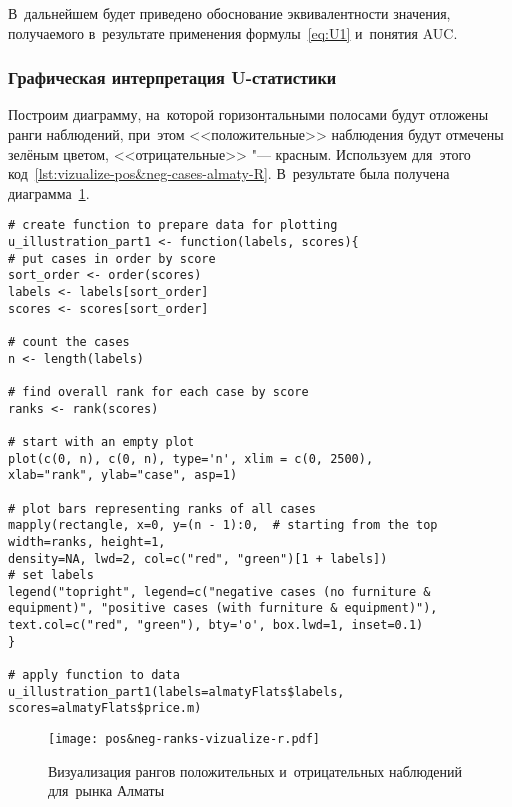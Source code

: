 \documentclass[]{scrreprt}
\begin{document}
В~дальнейшем будет приведено обоснование эквивалентности значения, получаемого в~результате применения формулы~\ref{eq:U1} и~понятия AUC.
%
\subsubsection{Графическая интерпретация U-статистики}
Построим диаграмму, на~которой горизонтальными полосами будут отложены ранги наблюдений, при~этом <<положительные>> наблюдения будут отмечены зелёным цветом, <<отрицательные>> "--- красным. Используем для~этого код~\ref{lst:vizualize-pos&neg-cases-almaty-R}. В~результате была получена диаграмма~\ref{fig:pos&neg-ranks-vizualize-r.pdf}.
%
\begin{lstlisting}[float, caption = Визуализация рангов положительных и~отрицательных наблюдений для~рынка Алматы, firstnumber=1, label= lst:vizualize-pos&neg-cases-almaty-R]
# create function to prepare data for plotting
u_illustration_part1 <- function(labels, scores){
# put cases in order by score
sort_order <- order(scores)
labels <- labels[sort_order]
scores <- scores[sort_order]

# count the cases
n <- length(labels)

# find overall rank for each case by score
ranks <- rank(scores)

# start with an empty plot
plot(c(0, n), c(0, n), type='n', xlim = c(0, 2500),
xlab="rank", ylab="case", asp=1)

# plot bars representing ranks of all cases
mapply(rectangle, x=0, y=(n - 1):0,  # starting from the top 
width=ranks, height=1, 
density=NA, lwd=2, col=c("red", "green")[1 + labels])
# set labels   
legend("topright", legend=c("negative cases (no furniture & equipment)", "positive cases (with furniture & equipment)"), 
text.col=c("red", "green"), bty='o', box.lwd=1, inset=0.1)
}

# apply function to data
u_illustration_part1(labels=almatyFlats$labels, scores=almatyFlats$price.m)
\end{lstlisting}
%
\begin{figure}[ht]
	\centering
	\texttt{[image: pos\&neg-ranks-vizualize-r.pdf]}
	\caption{Визуализация рангов положительных и~отрицательных наблюдений для~рынка Алматы}
	\label{fig:pos&neg-ranks-vizualize-r.pdf}
\end{figure}
%
\end{document}

